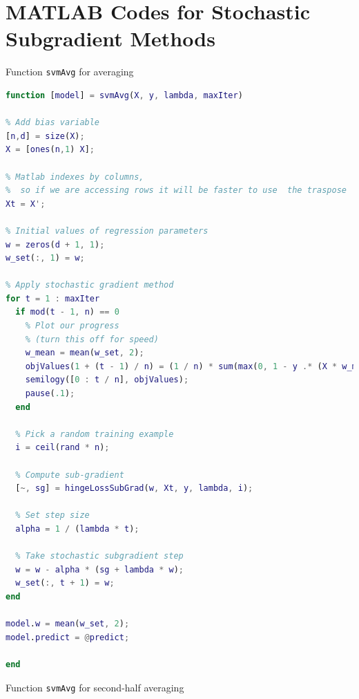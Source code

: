 \documentclass[10pt]{article}
\begin{document}
\section{MATLAB Codes for Stochastic Subgradient Methods}
\label{app_A}
Function \texttt{svmAvg} for averaging
\begin{lstlisting}[language=MATLAB]
function [model] = svmAvg(X, y, lambda, maxIter)

% Add bias variable
[n,d] = size(X);
X = [ones(n,1) X];

% Matlab indexes by columns,
%  so if we are accessing rows it will be faster to use  the traspose
Xt = X';

% Initial values of regression parameters
w = zeros(d + 1, 1);
w_set(:, 1) = w;

% Apply stochastic gradient method
for t = 1 : maxIter
  if mod(t - 1, n) == 0
    % Plot our progress
    % (turn this off for speed)
    w_mean = mean(w_set, 2);
    objValues(1 + (t - 1) / n) = (1 / n) * sum(max(0, 1 - y .* (X * w_mean))) + (lambda / 2) * (w_mean' * w_mean);
    semilogy([0 : t / n], objValues);
    pause(.1);
  end

  % Pick a random training example
  i = ceil(rand * n);

  % Compute sub-gradient
  [~, sg] = hingeLossSubGrad(w, Xt, y, lambda, i);

  % Set step size
  alpha = 1 / (lambda * t);

  % Take stochastic subgradient step
  w = w - alpha * (sg + lambda * w);
  w_set(:, t + 1) = w;
end

model.w = mean(w_set, 2);
model.predict = @predict;

end
\end{lstlisting}
\clearpage
Function \texttt{svmAvg} for second-half averaging
\end{document}
